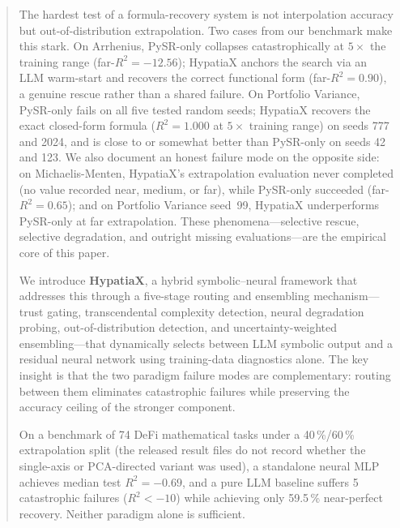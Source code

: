 \documentclass[twoside,11pt]{article}
\newcommand{\Rsq}{R^{2}}
\begin{document}
\begin{abstract}
The hardest test of a formula-recovery system is not interpolation accuracy but
out-of-distribution extrapolation.  Two cases from our benchmark make this stark.
On Arrhenius, PySR-only collapses catastrophically at $5\times$ the
training range (far-$\Rsq = -12.56$); HypatiaX anchors the search via an
LLM warm-start and recovers the correct functional form (far-$\Rsq = 0.90$),
a genuine rescue rather than a shared failure. On Portfolio
Variance, PySR-only fails on all five tested random seeds; HypatiaX recovers
the exact closed-form formula ($\Rsq=1.000$ at $5\times$ training range) on
seeds 777 and 2024, and is close to or somewhat better than PySR-only on
seeds 42 and 123. We also document an honest failure mode on the opposite
side: on Michaelis-Menten, HypatiaX's extrapolation evaluation never
completed (no value recorded near, medium, or far), while PySR-only
succeeded (far-$\Rsq = 0.65$); and on Portfolio Variance seed~99, HypatiaX
underperforms PySR-only at far extrapolation. These phenomena---selective
rescue, selective degradation, and outright missing evaluations---are the
empirical core of this paper.

We introduce \textbf{HypatiaX}, a hybrid symbolic--neural framework that
addresses this through a five-stage routing and ensembling mechanism---trust
gating, transcendental complexity detection, neural degradation probing,
out-of-distribution detection, and uncertainty-weighted ensembling---that
dynamically selects between LLM symbolic output and a residual neural network
using training-data diagnostics alone.  The key insight is that the two paradigm
failure modes are complementary: routing between them eliminates catastrophic
failures while preserving the accuracy ceiling of the stronger component.

On a benchmark of 74 DeFi mathematical tasks under a 40\,\%/60\,\% extrapolation split (the released result files do not record whether the single-axis or PCA-directed variant was used), a standalone neural MLP achieves
median test $\Rsq = -0.69$, and a pure LLM baseline suffers 5 catastrophic
failures ($\Rsq < -10$) while achieving only 59.5\,\% near-perfect recovery.
Neither paradigm alone is sufficient.


\end{abstract}
\end{document}
